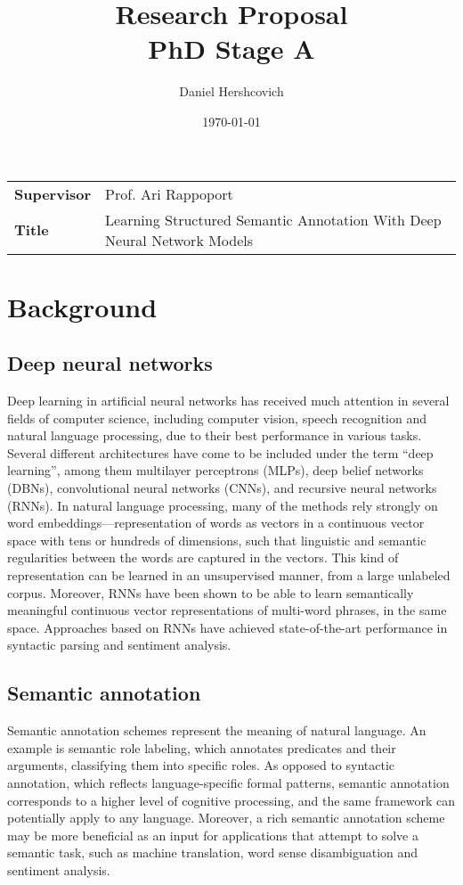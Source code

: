 \documentclass[11pt]{article}
\title{Research Proposal \\ PhD Stage A}
\author{Daniel Hershcovich}
\date{\today}
\begin{document}
\maketitle

\begin{table}[!th]
\begin{tabular}{>{\bfseries}l p{}}
Supervisor & Prof. Ari Rappoport \\
Title & Learning Structured Semantic Annotation With Deep Neural Network Models
\end{tabular}
\end{table}

\section{Background}

\subsection{Deep neural networks}

Deep learning in artificial neural networks has received much attention in several fields of computer science, including computer vision, speech recognition and natural language processing, due to their best performance in various tasks. Several different architectures have come to be included under the term “deep learning”, among them multilayer perceptrons (MLPs), deep belief networks (DBNs), convolutional neural networks (CNNs), and recursive neural networks (RNNs). In natural language processing, many of the methods rely strongly on word embeddings---representation of words as vectors in a continuous vector space with tens or hundreds of dimensions, such that linguistic and semantic regularities between the words are captured in the vectors. This kind of representation can be learned in an unsupervised manner, from a large unlabeled corpus. Moreover, RNNs have been shown to be able to learn semantically meaningful continuous vector representations of multi-word phrases, in the same space. Approaches based on RNNs have achieved state-of-the-art performance in syntactic parsing and sentiment analysis.

\subsection{Semantic annotation}

Semantic annotation schemes represent the meaning of natural language. An example is semantic role labeling, which annotates predicates and their arguments, classifying them into specific roles. As opposed to syntactic annotation, which reflects language-specific formal patterns, semantic annotation corresponds to a higher level of cognitive processing, and the same framework can potentially apply to any language. Moreover, a rich semantic annotation scheme may be more beneficial as an input for applications that attempt to solve a semantic task, such as machine translation, word sense disambiguation and sentiment analysis.
\end{document}
